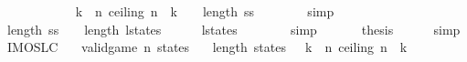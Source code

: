 \begin{isabellebody}
\ \ \isamarkupfalse%
\isanewline
\ \ \isamarkupfalse%
\ \isanewline
\ \ \isamarkupfalse%
\ {\isachardoublequoteopen}{\isacharparenleft}{\isasymSum}\ k\ {\isasymleftarrow}\ {\isacharbrackleft}{}{\isachardot}{\isachardot}{\isacharless}n{\isacharplus}{}{\isacharbrackright}{\isachardot}\ {\isacharparenleft}ceiling\ {\isacharparenleft}n\ {\isacharslash}\ k{\isacharparenright}{\isacharparenright}{\isacharparenright}\ {\isacharplus}\ {}\ {\isasymle}\ length\ {\isacharquery}ss\ {\isacharplus}\ {}{\isachardoublequoteclose}\isanewline
\ \ \ \ \isamarkupfalse%
\ simp\isanewline
\ \ \isamarkupfalse%
\isanewline
\ \ \isamarkupfalse%
\ {\isachardoublequoteopen}length\ {\isacharquery}ss\ {\isacharplus}\ {}\ {\isacharequal}\ length\ l{\isacharunderscore}states{\isachardoublequoteclose}\isanewline
\ \ \ \ \isamarkupfalse%
\ {\isacharbackquoteopen}l{\isacharunderscore}states\ {\isasymnoteq}\ {\isacharbrackleft}{\isacharbrackright}{\isacharbackquoteclose}\isanewline
\ \ \ \ \isamarkupfalse%
\ simp\isanewline
\ \ \isamarkupfalse%
\isanewline
\ \ \isamarkupfalse%
\ {\isacharquery}thesis\isanewline
\ \ \ \ \isamarkupfalse%
\ simp\isanewline
{}\isamarkupfalse%
%
\endisatagproof
{\isafoldproof}%
%
\isadelimproof
%
\endisadelimproof
%
\isadelimdocument
%
\endisadelimdocument
%
\isatagdocument
%
\isamarkuptrue%
%
\endisatagdocument
{\isafolddocument}%
%
\isadelimdocument
%
\endisadelimdocument
{}\isamarkupfalse%
\ IMO{}{}{}{}SL{\isacharunderscore}C{}{\isacharcolon}\isanewline
\ \ \ {\isachardoublequoteopen}valid{\isacharunderscore}game\ n\ states{\isachardoublequoteclose}\isanewline
\ \ \ {\isachardoublequoteopen}length\ states\ {\isasymge}\ {\isacharparenleft}{\isasymSum}\ k\ {\isasymleftarrow}\ {\isacharbrackleft}{}{\isachardot}{\isachardot}{\isacharless}n{\isacharplus}{}{\isacharbrackright}{\isachardot}\ {\isacharparenleft}ceiling\ {\isacharparenleft}n\ {\isacharslash}\ k{\isacharparenright}{\isacharparenright}{\isacharparenright}\ {\isacharplus}\ {}{\isachardoublequoteclose}\isanewline
%
\isadelimproof
%
\endisadelimproof
%
\isatagproof
{}\isamarkupfalse%
{\isacharminus}\isanewline
\ \ \isamarkupfalse%

\end{isabellebody}
